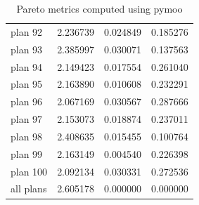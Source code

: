 \begin{table}[h!]
\begin{tabular}{lccc}
plan 92 & 2.236739 & 0.024849 & 0.185276 \\
plan 93 & 2.385997 & 0.030071 & 0.137563 \\
plan 94 & 2.149423 & 0.017554 & 0.261040 \\
plan 95 & 2.163890 & 0.010608 & 0.232291 \\
plan 96 & 2.067169 & 0.030567 & 0.287666 \\
plan 97 & 2.153073 & 0.018874 & 0.237011 \\
plan 98 & 2.408635 & 0.015455 & 0.100764 \\
plan 99 & 2.163149 & 0.004540 & 0.226398 \\
plan 100 & 2.092134 & 0.030331 & 0.272536 \\
all plans & 2.605178 & 0.000000 & 0.000000 \\
\hline
\end{tabular}
\caption{Pareto metrics computed using pymoo}
\end{table}